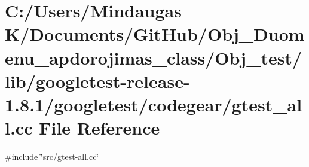 \hypertarget{_obj__test_2lib_2googletest-release-1_88_81_2googletest_2codegear_2gtest__all_8cc}{}\section{C\+:/\+Users/\+Mindaugas K/\+Documents/\+Git\+Hub/\+Obj\+\_\+\+Duomenu\+\_\+apdorojimas\+\_\+class/\+Obj\+\_\+test/lib/googletest-\/release-\/1.8.1/googletest/codegear/gtest\+\_\+all.cc File Reference}
\label{_obj__test_2lib_2googletest-release-1_88_81_2googletest_2codegear_2gtest__all_8cc}
{\ttfamily \#include \char`\"{}src/gtest-\/all.\+cc\char`\"{}}\newline
